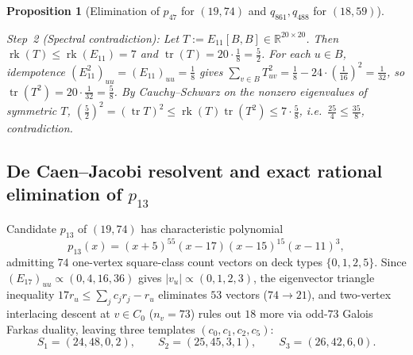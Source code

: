 \documentclass[11pt,reqno]{amsart}
\newtheorem{proposition}[theorem]{Proposition}
\theoremstyle{definition}
\theoremstyle{remark}
\DeclareMathOperator{\tr}{tr}
\DeclareMathOperator{\rk}{rk}
\begin{document}
\begin{proposition}[Elimination of $p_{47}$ for $(19, 74)$ and $q_{861}, q_{488}$ for $(18, 59)$]
\begin{enumerate}
  \emph{Step~2 (Spectral contradiction):} Let $T := E_{11}[B, B] \in \mathbb{R}^{20 \times 20}$. Then $\rk(T) \le \rk(E_{11}) = 7$ and $\tr(T) = 20 \cdot \frac{1}{8} = \frac{5}{2}$. For each $u \in B$, idempotence $(E_{11}^2)_{uu} = (E_{11})_{uu} = \frac{1}{8}$ gives $\sum_{v \in B} T_{uv}^2 = \frac{1}{8} - 24\cdot(\frac{1}{16})^2 = \frac{1}{32}$, so $\tr(T^2) = 20 \cdot \frac{1}{32} = \frac{5}{8}$. By Cauchy--Schwarz on the nonzero eigenvalues of symmetric $T$, $(\frac{5}{2})^2 = (\tr T)^2 \le \rk(T)\tr(T^2) \le 7 \cdot \frac{5}{8}$, i.e.\ $\frac{25}{4} \le \frac{35}{8}$, contradiction.
\end{enumerate}
\end{proposition}

\subsection{De Caen--Jacobi resolvent and exact rational elimination of \texorpdfstring{$p_{13}$}{p\_13}}
Candidate $p_{13}$ of $(19, 74)$ has characteristic polynomial
\[
  p_{13}(x) = (x+5)^{55}(x-17)(x-15)^{15}(x-11)^3,
\]
admitting $74$ one-vertex square-class count vectors on deck types $\{0, 1, 2, 5\}$. Since $(E_{17})_{uu} \propto (0, 4, 16, 36)$ gives $|v_u| \propto (0, 1, 2, 3)$, the eigenvector triangle inequality $17 r_u \le \sum_j c_j r_j - r_u$ eliminates $53$ vectors ($74 \to 21$), and two-vertex interlacing descent at $v \in C_0$ ($n_v = 73$) rules out $18$ more via odd-$73$ Galois Farkas duality, leaving three templates $(c_0, c_1, c_2, c_5)$:
\[
  S_1 = (24, 48, 0, 2), \qquad S_2 = (25, 45, 3, 1), \qquad S_3 = (26, 42, 6, 0).
\]
\end{document}
